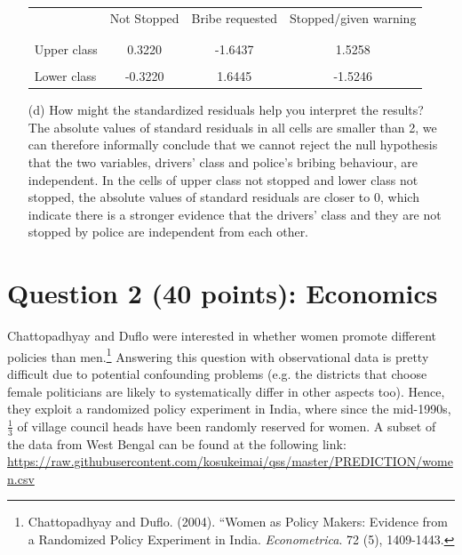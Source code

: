 \documentclass[12pt,letterpaper]{article}
\begin{document}
\begin{enumerate}
	
	\begin{table}[h]
		\centering
		\begin{tabular}{l | c c c }
			& Not Stopped & Bribe requested & Stopped/given warning \\
			\\[-1.8ex] 
			\hline \\[-1.8ex]
			Upper class  & 0.3220 & -1.6437 & 1.5258 \\
			\\
			Lower class & -0.3220 & 1.6445  & -1.5246  \\
			
		\end{tabular}
	\end{table}
	
	
	\vspace{7cm}
	\item [(d)] How might the standardized residuals help you interpret the results?  \\
	 The absolute values of standard residuals in all cells are smaller than 2, we can therefore informally conclude that we cannot reject the null hypothesis that the two variables, drivers' class and police's bribing behaviour, are independent. In the cells of upper class not stopped and lower class not stopped, the absolute values of standard residuals are closer to 0, which indicate there is a stronger evidence that the drivers' class and they are not stopped by police are independent from each other. 
	
	
\end{enumerate}
\newpage

\section*{Question 2 (40 points): Economics}
Chattopadhyay and Duflo were interested in whether women promote different policies than men.\footnote{Chattopadhyay and Duflo. (2004). ``Women as Policy Makers: Evidence from a Randomized Policy Experiment in India. \textit{Econometrica}. 72 (5), 1409-1443.} Answering this question with observational data is pretty difficult due to potential confounding problems (e.g. the districts that choose female politicians are likely to systematically differ in other aspects too). Hence, they exploit a randomized policy experiment in India, where since the mid-1990s, $\frac{1}{3}$ of village council heads have been randomly reserved for women. A subset of the data from West Bengal can be found at the following link: \url{https://raw.githubusercontent.com/kosukeimai/qss/master/PREDICTION/women.csv}\\
\end{document}
